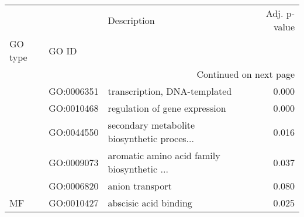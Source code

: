 \begin{longtable}{lllr}
\toprule
   &            &                                  Description &  Adj. p-value \\
GO type & GO ID &                                              &               \\
\midrule
\endhead
\midrule
\multicolumn{4}{r}{{Continued on next page}} \\
\midrule
\endfoot

\bottomrule
\endlastfoot
\multirow{5}{*}{BP} & GO:0006351 &                 transcription, DNA-templated &         0.000 \\
   & GO:0010468 &                regulation of gene expression &         0.000 \\
   & GO:0044550 &  secondary metabolite biosynthetic proces... &         0.016 \\
   & GO:0009073 &  aromatic amino acid family biosynthetic ... &         0.037 \\
   & GO:0006820 &                              anion transport &         0.080 \\
\cline{1-4}
MF & GO:0010427 &                        abscisic acid binding &         0.025 \\
\end{longtable}
